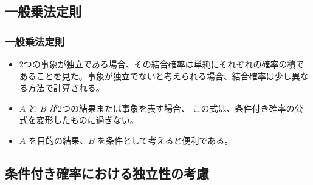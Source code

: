 
\subsection{一般乗法定則}


\begin{frame}
\frametitle{一般乗法定則}

\begin{itemize}

\item 2つの事象が独立である場合、その結合確率は単純にそれぞれの確率の積であることを見た。事象が独立でないと考えられる場合、結合確率は少し異なる方法で計算される。

\item $A$ と $B$ が2つの結果または事象を表す場合、
\formula{\[ P(A~\text{かつ}~B) = P(A|B) \times P(B) \]}
この式は、条件付き確率の公式を変形したものに過ぎない。

\item $A$ を目的の結果、$B$ を条件として考えると便利である。

\end{itemize}

\end{frame}


\subsection{条件付き確率における独立性の考慮}


